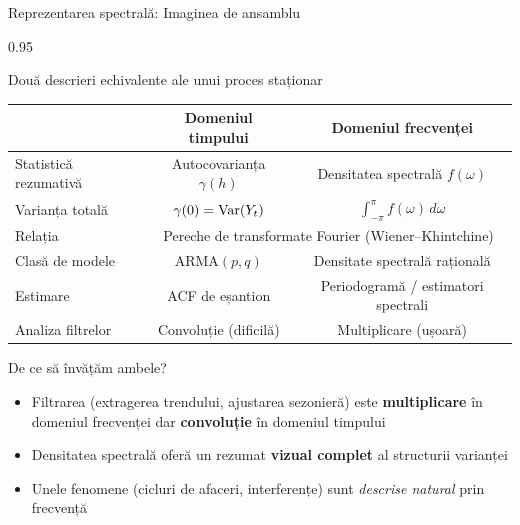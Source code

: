 \documentclass[9pt, aspectratio=169, t]{beamer}
\begin{document}
\begin{frame}{Reprezentarea spectrală: Imaginea de ansamblu}
    \begin{cminipage}{0.95\textwidth}
    \vspace{-2mm}
    \begin{block}{Două descrieri echivalente ale unui proces staționar}
        {\small
        \begin{center}
        \begin{tabular}{l|c|c}
            \toprule
            & \textbf{Domeniul timpului} & \textbf{Domeniul frecvenței} \\
            \midrule
            Statistică rezumativă & Autocovarianța $\gamma(h)$ & Densitatea spectrală $f(\omega)$ \\
            Varianța totală & $\gamma(0) = \text{Var}(Y_t)$ & $\displaystyle\int_{-\pi}^{\pi} f(\omega)\,d\omega$ \\
            Relația & \multicolumn{2}{c}{Pereche de transformate Fourier (Wiener--Khintchine)} \\
            Clasă de modele & ARMA$(p,q)$ & Densitate spectrală rațională \\
            Estimare & ACF de eșantion & Periodogramă / estimatori spectrali \\
            Analiza filtrelor & Convoluție (dificilă) & Multiplicare (ușoară) \\
            \bottomrule
        \end{tabular}
        \end{center}
        }
    \end{block}
    \vspace{-2mm}
    \begin{exampleblock}{De ce să învățăm ambele?}
        \begin{itemize}\setlength{\itemsep}{-2pt}
            \item Filtrarea (extragerea trendului, ajustarea sezonieră) este \textbf{multiplicare} în domeniul frecvenței dar \textbf{convoluție} în domeniul timpului
            \item Densitatea spectrală oferă un rezumat \textbf{vizual complet} al structurii varianței
            \item Unele fenomene (cicluri de afaceri, interferențe) sunt \textit{descrise natural} prin frecvență
        \end{itemize}
    \end{exampleblock}
    \end{cminipage}
\end{frame}
\end{document}
